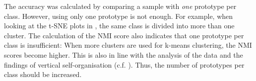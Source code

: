The accuracy was calculated by comparing a sample with \emph{one} prototype per class. However, using only one prototype is not enough. For example, when looking at the t-SNE plots in , the same class is divided into more than one cluster. The calculation of the NMI score also indicates that one prototype per class is insufficient: When more clusters are used for k-means clustering, the NMI scores become higher. This is also in line with the analysis of the data and the findings of vertical self-organisation (c.f. ). Thus, the number of prototypes per class should be increased.








